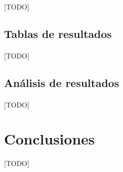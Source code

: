 \documentclass{subfiles}
\begin{document}
        \paragraph{}
        [TODO]

      \subsection{Tablas de resultados}
      \label{sec:results_tables}

        \paragraph{}
        [TODO]

      \subsection{Análisis de resultados}
      \label{sec:results_analysis}

        \paragraph{}
        [TODO]

    \section{Conclusiones}
    \label{sec:implementation_results_conclusions}

      \paragraph{}
      [TODO]
\end{document}
